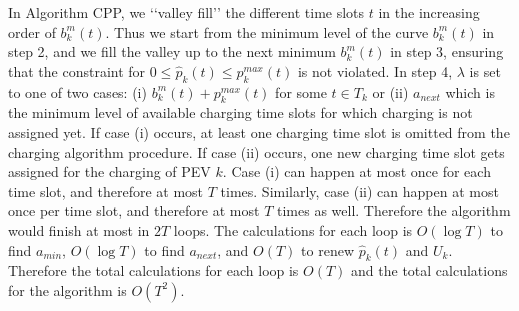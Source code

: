 \documentclass[12pt,draftcls,onecolumn]{IEEEtran}
\begin{document}
\indent In Algorithm CPP, we \lq\lq{}valley fill\rq\rq{} the different time slots $t$ in the increasing order of $b_k^m(t)$. Thus we start from the minimum level of the curve $b_k^m(t)$ in step 2, and we fill the valley up to the next minimum $b_k^m(t)$ in step 3, ensuring that the constraint for $0 \leq \hat{p}_k(t) \leq p_k^{max}(t)$ is not violated. In step 4, $\lambda$ is set to one of two cases: (i) $b_k^m(t) + p_k^{max}(t)$ for some $t \in T_k$ or (ii) $a_{next}$ which is the minimum level of available charging time slots for which charging is not assigned yet. If case (i) occurs, at least one charging time slot is omitted from the charging algorithm procedure. If case (ii) occurs, one new charging time slot gets assigned for the charging of PEV $k$. Case (i) can happen at most once for  each time slot, and therefore at most $T$ times. Similarly, case (ii) can happen at most once per time slot, and therefore at most $T$ times as well. Therefore the algorithm would finish at most in $2T$ loops. The calculations for each loop is $O(\log T)$ to find $a_{min}$, $O(\log T)$ to find  $a_{next}$, and $O(T)$ to renew $\hat{p}_k(t)$ and $U_k$. Therefore the total calculations for each loop is $O(T)$ and the total calculations for the algorithm is $O(T^2)$.
\end{document}
